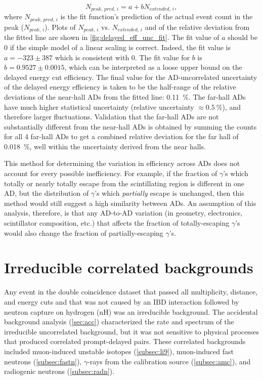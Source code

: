 \begin{equation}
    N_{peak,\,pred,\,i} = a + b N_{extended,\,i},
\end{equation}
where $N_{peak,\,pred,\,i}$ is the fit function's prediction
of the actual event count in the peak ($N_{peak,\,i}$).
Plots of $N_{peak,\,i}$ vs. $N_{extended,\,i}$ and of the
relative deviation from the fitted line are shown in \cref{fig:delayed_eff_unc_fit}.
The fit value of $a$ should be $0$ if the simple model of
a linear scaling is correct.
Indeed, the fit value is $a = -323 \pm 387$
which is consistent with $0$.
The fit value for $b$ is $b = 0.9527 \pm 0.0015$,
which can be interpreted as a loose upper bound
on the delayed energy cut efficiency.
The final value for the AD-uncorrelated uncertainty
of the delayed energy efficiency is taken to be
the half-range of the relative deviations
of the near-hall ADs from the fitted line: \SI{0.11}{\percent}.
The far-hall ADs have much higher statistical uncertainty
(relative uncertainty $\approx\SI{0.5}{\percent}$),
and therefore larger fluctuations.
Validation that the far-hall ADs are not
substantially different from the near-hall ADs is obtained by
summing the counts for all 4 far-hall ADs to get
a combined relative deviation for the far hall of \SI{0.018}{\percent},
well within the uncertainty derived from the near halls.

This method for determining the variation in efficiency across ADs
does not account for every possible inefficiency.
For example, if the fraction of $\gamma$'s which totally or nearly totally
escape from the scintillating region is different in one AD,
but the distribution of $\gamma$'s which \textit{partially} escape is unchanged,
then this method would still suggest a high similarity between ADs.
An assumption of this analysis, therefore, is that any AD-to-AD variation
(in geometry, electronics, scintillator composition, etc.)
that affects the fraction of totally-escaping $\gamma$'s
would also change the fraction of partially-escaping $\gamma$'s.

\section{Irreducible correlated backgrounds}
\label{sec:correlated_bg}

Any event in the double coincidence dataset
that passed all multiplicity, distance, and energy cuts
and that was not caused by an IBD interaction followed by
neutron capture on hydrogen (nH)
was an irreducible background.
The accidental background analysis (\cref{sec:acc})
characterized the rate and spectrum of
the irreducible uncorrelated background,
but it was not sensitive to physical processes that produced
correlated prompt-delayed pairs.
These correlated backgrounds included muon-induced unstable isotopes (\cref{subsec:li9}),
muon-induced fast neutrons (\cref{subsec:fastn}),
$\gamma$-rays from the \amc{} calibration source (\cref{subsec:amc}),
and radiogenic neutrons (\cref{subsec:radn}).

